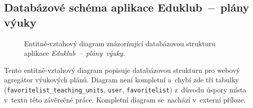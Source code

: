 \documentclass[male,czech,api_bc]{kitheses}
\begin{document}
\subsection{Databázové schéma aplikace Eduklub~--~plány výuky}

\begin{figure}[H]
	\centering
	\caption{Entitně-vztahový diagram znázorňující databázovou strukturu aplikace \mbox{\textit{Eduklub~--~plány výuky}.}}
	\label{fig:erd-2}
\end{figure}

Tento entitně-vztahový diagram popisuje databázovou strukturu pro webový agregátor výukových plánů. Diagram není kompletní a~chybí zde tři tabulky (\texttt{favoritelist\_teaching\_units}, \texttt{user}, \texttt{favoritelist}) z~důvodu úspory místa v~textu této závěrečné práce. Kompletní diagram se~nachází v~externí příloze.
\end{document}
